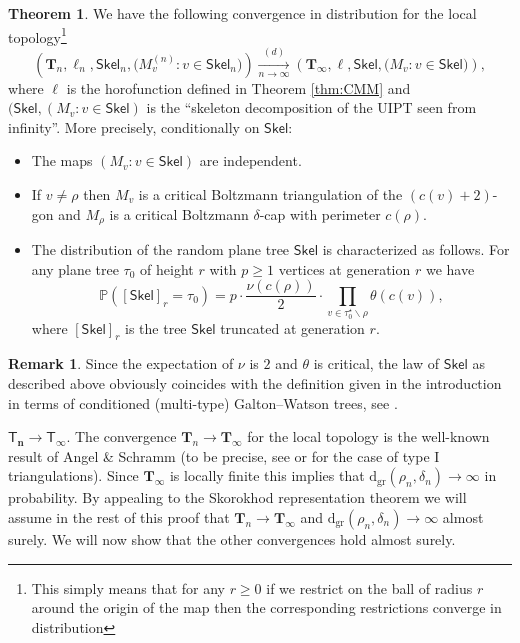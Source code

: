 \documentclass[10pt]{amsart}
\theoremstyle{definition}\newtheorem{defi}[theo]{Definition}\newtheorem{rema}[theo]{Remark}\newtheorem{exam}[theo]{Example}\newtheorem{exem}[theo]{Example}\newtheorem{nota}[theo]{Notation}
\newtheorem{theorem}[theo]{Theorem}\newtheorem{thm}[theo]{Theorem}\newtheorem{lemma}[theo]{Lemma}\newtheorem{proposition}[theo]{Proposition}\newtheorem{corollary}[theo]{Corollary}\newtheorem{remark}[theo]{Remark}\newtheorem{definition}[theo]{Definition}
\begin{document}
\begin{theorem} \label{thm:skeletoninfinity} We have the following convergence in distribution for the local topology\footnote{This simply means that for any $r\geq 0$ if we restrict on the ball of radius $r$ around the origin of the map then the corresponding restrictions converge in distribution}
$$ \left( \mathbf{T}_{n}, \ell_{n}, \mathsf{Skel}_{n} , \big( M_{v}^{(n)} : v \in \mathsf{Skel}_{n} \big)\right) \xrightarrow[n\to\infty]{(d)} \left( \mathbf{T}_{\infty}, \ell, \mathsf{Skel}, \big( M_{v} : v \in \mathsf{Skel} \big)\right),$$
where $\ell$ is the horofunction defined in Theorem \ref{thm:CMM} and $(\mathsf{Skel}, ( M_{v} : v \in \mathsf{Skel} )$ is the ``skeleton decomposition of the UIPT seen from infinity''. More precisely, conditionally on $ \mathsf{Skel}$:
\begin{itemize}
\item The maps $(M_{v} : v \in \mathsf{Skel})$ are independent.
\item If $v \ne \rho$ then $M_{v}$ is a critical Boltzmann triangulation of the $(c(v)+2)$-gon and $M_{\rho}$ is a critical Boltzmann $\delta$-cap with perimeter $c(\rho)$.
\item The distribution of the random plane tree $ \mathsf{Skel}$ is characterized as follows. For any plane tree $\tau_{0}$ of height $r$ with $p \geq 1$ vertices at generation $r$ we have
$$ \mathbb{P}([ \mathsf{Skel}]_{r} = \tau_{0}) = p \cdot \frac{\nu( c(\rho))}{2} \cdot \prod_{v \in \tau_{0}^{\star}\backslash \rho} \theta( c(v)),$$
where $[ \mathsf{Skel}]_{r}$ is the tree $ \mathsf{Skel}$ truncated at generation $r$.
\end{itemize}
\end{theorem}
\begin{remark}
Since the expectation of $\nu$ is $2$ and $\theta$ is critical, the law of $ \mathsf{Skel}$ as described above obviously coincides with the definition given in the introduction in terms of conditioned (multi-type) Galton--Watson trees, see \cite{ADG}.\end{remark}
\proof  $ \boldsymbol{\mathsf{T}_{n} \to \mathsf{T}_{\infty}}$. The convergence $ \mathbf{T}_{n} \to \mathbf{T}_{\infty}$ for the local topology is the well-known result of Angel \& Schramm (to be precise, see \cite{Ste14} or \cite{CLGfpp} for the case of type I triangulations). Since $ \mathbf{T}_{\infty}$ is locally finite this implies that $ \mathrm{d_{gr}}(\rho_{n}, \delta_{n}) \to \infty$ in probability. By appealing to the Skorokhod representation theorem we will assume in the rest of this proof that $ \mathbf{T}_{n} \to \mathbf{T}_{\infty}$ and $ \mathrm{d_{gr}}( \rho_{n}, \delta_{n}) \to \infty$ almost surely. We will now show that the other convergences hold almost surely.
\end{document}
